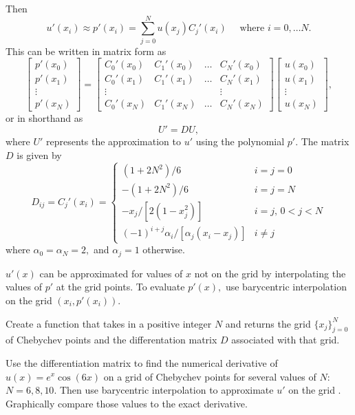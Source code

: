 Then 
\[u'(x_i) \approx p'(x_i) = \sum_{j=0}^N u(x_j)C_j'(x_i) \quad \text{ where } i = 0, \ldots N.\]
This can be written in matrix form as 
\begin{equation*}
	\left[\begin{array}{c}p'(x_0) \\p'(x_1)\\\vdots \\p'(x_N)\end{array}\right] =
\left[\begin{array}{cccc}C_0'(x_0) & C_1'(x_0) & \ldots & C_N'(x_0) \\C_0'(x_1) & C_1'(x_1) & \ldots & C_N'(x_1) \\\vdots &  &  & \vdots \\C_0'(x_N) & C_1'(x_N) & \ldots & C_N'(x_N)\end{array}\right]
\left[\begin{array}{c}u(x_0) \\u(x_1)\\\vdots \\u(x_N)\end{array}\right],
\end{equation*}
or in shorthand as 
\[U' = D U,\]
where $U'$ represents the approximation to $u'$ using the polynomial $p'$.
The matrix $D$ is given by
\begin{equation*}
D_{ij} = C_j'(x_i) = \begin{cases} (1+2N^2)/6 & i=j=0 \\ -(1+2N^2)/6 & i=j=N \\
-x_j/[2(1-x_j^2)] & i=j, \, 0<j<N \\ 
(-1)^{i+j}\alpha_i/[\alpha_j(x_i-x_j)] & i \not = j
   \end{cases}
\end{equation*}
where $\alpha_0 = \alpha_N = 2,$ and $\alpha_j = 1$ otherwise. 

$u'(x)$ can be approximated for values of $x$ not on the grid by interpolating the values of $p'$ at the grid points.
To evaluate $p'(x),$ use barycentric interpolation on the grid $(x_i,p'(x_i))$.

\begin{problem}
Create a function  that takes in a positive integer $N$ and returns the grid $\{x_j\}_{j=0}^N$ of Chebychev points and the differentation matrix $D$ associated with that grid. 
	
Use the differentiation matrix to find the numerical derivative of $u(x) = e^{x}\cos(6x)$ on a grid of Chebychev points for several values of $N:$ $N=6, 8, 10.$
Then use barycentric interpolation to approximate $u'$ on the grid .
Graphically compare those values to the exact derivative. 
\end{problem}

